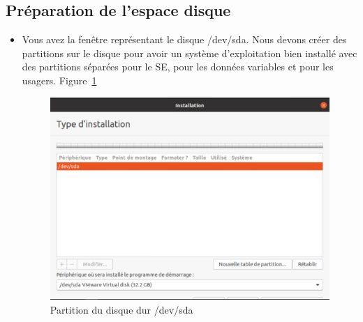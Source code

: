 	\subsection{Préparation de l'espace disque}
	\begin{itemize}
		\item  Vous avez la fenêtre représentant le disque /dev/sda. Nous devons créer des partitions sur le disque pour avoir un système d'exploitation bien installé avec des partitions séparées pour le SE, pour les données variables et pour les usagers. Figure~\ref{Fig8}
		
		\begin{figure}[!htb]
			\centering
			\caption{\label{Fig8}Partition du disque dur /dev/sda}
			\includegraphics[scale=0.49]{images/Capture10}
		\end{figure}
		

\end{itemize}
